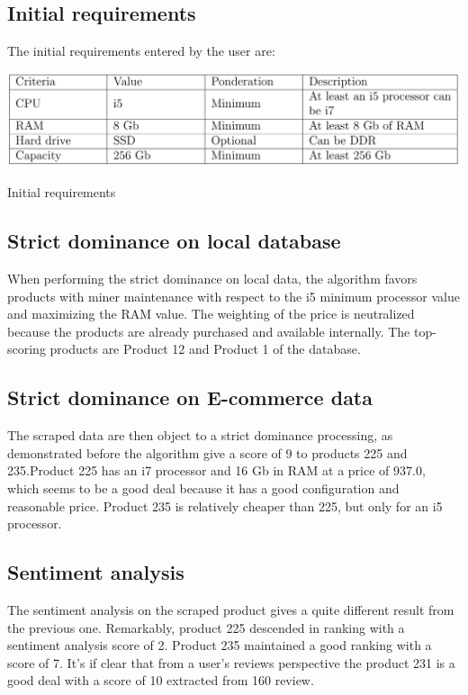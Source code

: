 \documentclass[preprint,3p,onecolumn]{elsarticle}
\begin{document}
\subsection{Initial requirements}
\par The initial requirements entered by the user are:

\begin{table}[H]
\centering
\includegraphics[scale=.4]{res_initail_req}
\caption{Initial requirements}
\label{res_initail_req}
\end{table}

\subsection{Strict dominance on local database}
\par When performing the strict dominance on local data, the algorithm favors products with miner
maintenance with respect to the i5 minimum processor value and maximizing the RAM value.
The weighting of the price is neutralized because the products are already purchased and available internally. The top-scoring products are Product 12 and Product 1 of the database.

\subsection{Strict dominance on E-commerce data}
\par The scraped data are then object to a strict dominance processing, as demonstrated before the algorithm give a score of 9 to products 225 and 235.Product 225 has an i7 processor and 16 Gb in RAM at a price of 937.0, which seems to be a good deal because it has a good configuration and reasonable price. Product 235 is relatively cheaper than 225, but only for an i5 processor.

\subsection{Sentiment analysis}
\par The sentiment analysis on the scraped product gives a quite different result from the previous one. Remarkably, product 225 descended in ranking with a sentiment analysis score of 2. Product 235 maintained a good ranking with a score of 7. It’s if clear that from a user’s reviews perspective the product 231 is a good deal with a score of 10 extracted from 160 review.
\end{document}
